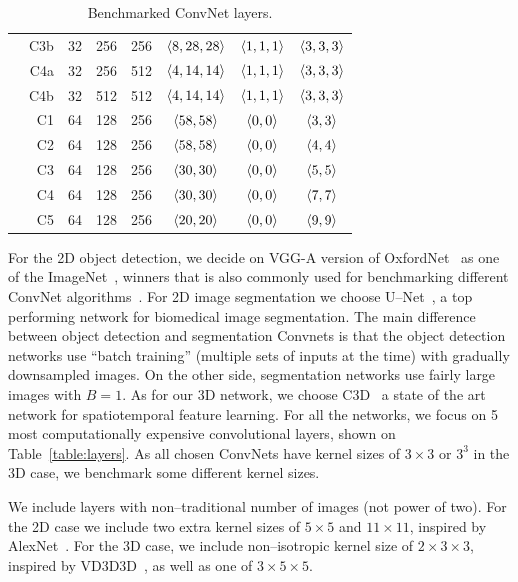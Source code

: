 \begin{table}
\begin{tabular}{cr !{\vrule width0.8pt} cccccc  }
      & C3b & 32  & 256 &  256 & $\langle8,28,28\rangle$ & $\langle1,1,1\rangle$ & $\langle3,3,3\rangle$ \\
      & C4a & 32  & 256 &  512 & $\langle4,14,14\rangle$ & $\langle1,1,1\rangle$ & $\langle3,3,3\rangle$ \\
      & C4b & 32  & 512 &  512 & $\langle4,14,14\rangle$ & $\langle1,1,1\rangle$ & $\langle3,3,3\rangle$ \\
      \hline
      & C1 & 64  & 128 &  256 & $\langle58,58\rangle$ & $\langle0,0\rangle$ & $\langle3,3\rangle$ \\
      & C2 & 64  & 128 &  256 & $\langle58,58\rangle$ & $\langle0,0\rangle$ & $\langle4,4\rangle$ \\
      & C3 & 64  & 128 &  256 & $\langle30,30\rangle$ & $\langle0,0\rangle$ & $\langle5,5\rangle$ \\
      & C4 & 64  & 128 &  256 & $\langle30,30\rangle$ & $\langle0,0\rangle$ & $\langle7,7\rangle$ \\
      & C5 & 64  & 128 &  256 & $\langle20,20\rangle$ & $\langle0,0\rangle$ & $\langle9,9\rangle$ \\
      \hline
    \end{tabular}
    \caption{Benchmarked ConvNet layers.}
  \end{table}

  For the 2D object detection, we decide on VGG-A version of
  OxfordNet~\cite{simonyan2014very} as one of the
  ImageNet~\cite{imagenet_cvpr09,ILSVRC15}, winners that is also
  commonly used for benchmarking different ConvNet
  algorithms~\cite{imagenetwinners}.  For 2D image segmentation we
  choose U--Net~\cite{ronneberger2015u}, a top performing network for
  biomedical image segmentation.  The main difference between object
  detection and segmentation Convnets is that the object detection
  networks use ``batch training'' (multiple sets of inputs at the
  time) with gradually downsampled images.  On the other side,
  segmentation networks use fairly large images with $B=1$.  As for
  our 3D network, we choose C3D~\cite{maturana_iros_2015} a state of
  the art network for spatiotemporal feature learning.  For all the
  networks, we focus on 5 most computationally expensive convolutional
  layers, shown on Table~\ref{table:layers}.  As all chosen ConvNets
  have kernel sizes of $3 \times 3$ or $3^3$ in the 3D case, we
  benchmark some different kernel sizes.

  We include layers with non--traditional number of images (not power
  of two).  For the 2D case we include two extra kernel sizes of $5
  \times 5$ and $11 \times 11$, inspired by
  AlexNet~\cite{krizhevsky2012imagenet}.  For the 3D case, we include
  non--isotropic kernel size of $2 \times 3 \times 3$, inspired by
  VD3D3D~\cite{lee2015recursive}, as well as one of $3 \times 5 \times
  5$.


